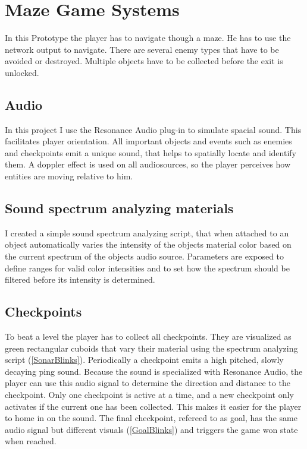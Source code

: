 
\chapter{Maze Game Systems}\label{MazeGameSystems}
 In this Prototype the player has to navigate though a maze. He has to use the network output to navigate. There are several enemy types that have to be avoided or destroyed. Multiple objects have to be collected before the exit is unlocked.

\section{Audio}
In this project I use the Resonance Audio plug-in to simulate spacial sound. This facilitates player orientation. All important objects and events such as enemies and checkpoints emit a unique sound, that helps to spatially locate and identify them. A doppler effect is used on all audiosources, so the player perceives how entities are moving relative to him.


\section{Sound spectrum analyzing materials}
I created a simple sound spectrum analyzing script, that when attached to an object automatically varies the intensity of the objects material color based on the current spectrum of the objects audio source. Parameters are exposed to define ranges for valid color intensities and to set how the spectrum should be filtered before its intensity is determined.


\section{Checkpoints}
To beat a level the player has to collect all checkpoints. They are visualized as green rectangular cuboids that vary their material using the spectrum analyzing script (\cref{SonarBlinks}). Periodically a checkpoint emits a high pitched, slowly decaying ping sound. Because the sound is specialized with Resonance Audio, the player can use this audio signal to determine the direction and distance to the checkpoint. Only one checkpoint is active at a time, and a new checkpoint only activates if the current one has been collected. This makes it easier for the player to home in on the sound. The final checkpoint, refereed to as goal, has the same audio signal but different visuals (\cref{GoalBlinks}) and triggers the game won state when reached.

